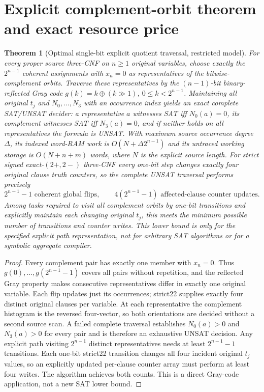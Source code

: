 \documentclass[10pt]{article}
\newtheorem{theorem}{Theorem}
\begin{document}
\section{Explicit complement-orbit theorem and exact resource price}
\begin{theorem}[Optimal single-bit explicit quotient traversal, restricted model]
For every proper source three-CNF on $n\ge1$ original variables, choose exactly the $2^{n-1}$ coherent assignments with $x_n=0$ as representatives of the bitwise-complement orbits. Traverse these representatives by the $(n-1)$-bit binary-reflected Gray code $g(k)=k\oplus(k\!\gg\!1)$, $0\le k<2^{n-1}$. Maintaining all original $t_j$ and $N_0,\ldots,N_3$ with an occurrence index yields an exact complete SAT/UNSAT decider: a representative $a$ witnesses SAT iff $N_0(a)=0$, its complement witnesses SAT iff $N_3(a)=0$, and if neither holds on all representatives the formula is UNSAT. With maximum source occurrence degree $\Delta$, its indexed word-RAM work is $O(N+\Delta2^{n-1})$ and its untraced working storage is $O(N+n+m)$ words, where $N$ is the explicit source length. For strict signed exact-$(2+,2-)$ three-CNF every one-bit step changes exactly four original clause truth counters, so the complete UNSAT traversal performs precisely
\[\boxed{2^{n-1}-1\text{ coherent global flips},\qquad 4(2^{n-1}-1)\text{ affected-clause counter updates}.}\]
Among tasks required to visit all complement orbits by one-bit transitions and explicitly maintain each changing original $t_j$, this meets the minimum possible number of transitions and counter writes. This lower bound is \emph{only for the specified explicit path representation}, not for arbitrary SAT algorithms or for a symbolic aggregate compiler.
\end{theorem}
\begin{proof}
Every complement pair has exactly one member with $x_n=0$. Thus $g(0),\ldots,g(2^{n-1}-1)$ covers all pairs without repetition, and the reflected Gray property makes consecutive representatives differ in exactly one original variable. Each flip updates just its occurrences; strict22 supplies exactly four distinct original clauses per variable. At each representative the complement histogram is the reversed four-vector, so both orientations are decided without a second source scan. A failed complete traversal establishes $N_0(a)>0$ and $N_3(a)>0$ for every pair and is therefore an exhaustive UNSAT decision. Any explicit path visiting $2^{n-1}$ distinct representatives needs at least $2^{n-1}-1$ transitions. Each one-bit strict22 transition changes all four incident original $t_j$ values, so an explicitly updated per-clause counter array must perform at least four writes. The algorithm achieves both counts. This is a direct Gray-code application, not a new SAT lower bound.
\end{proof}
\end{document}
